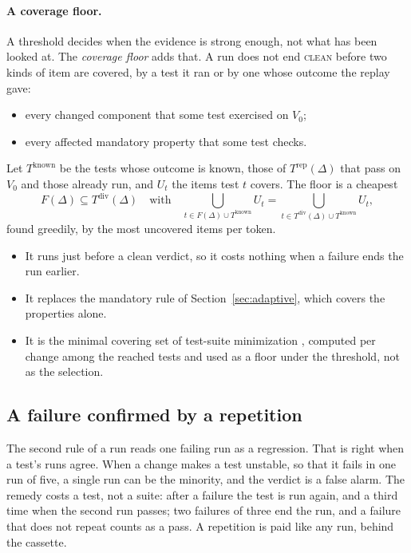 \documentclass[11pt,a4paper]{article}
\newcommand{\clean}{\textsc{clean}}
\begin{document}
\paragraph{A coverage floor.} A threshold decides when the evidence is strong enough, not what has been looked at.
The \emph{coverage floor} adds that. A run does not end \clean{} before two kinds of item are covered, by a test
it ran or by one whose outcome the replay gave:
\begin{itemize}
  \item every changed component that some test exercised on $V_0$;
  \item every affected mandatory property that some test checks.
\end{itemize}
Let $T^{\mathrm{known}}$ be the tests whose outcome is known, those of $T^{\mathrm{rep}}(\Delta)$ that pass on
$V_0$ and those already run, and $U_t$ the items test $t$ covers. The floor is a cheapest
\begin{equation}
  F(\Delta) \subseteq T^{\mathrm{div}}(\Delta) \quad \text{with} \quad
  \bigcup_{t \in F(\Delta) \cup T^{\mathrm{known}}} U_t =
  \bigcup_{t \in T^{\mathrm{div}}(\Delta) \cup T^{\mathrm{known}}} U_t ,
  \label{eq:floor}
\end{equation}
found greedily, by the most uncovered items per token.
\begin{itemize}
  \item It runs just before a clean verdict, so it costs nothing when a failure ends the run earlier.
  \item It replaces the mandatory rule of Section~\ref{sec:adaptive}, which covers the properties alone.
  \item It is the minimal covering set of test-suite minimization \cite{yoo2012regression}, computed per change
        among the reached tests and used as a floor under the threshold, not as the selection.
\end{itemize}

\subsection{A failure confirmed by a repetition}
\label{sec:confirm}

The second rule of a run reads one failing run as a regression. That is right when a test's runs agree. When a
change makes a test unstable, so that it fails in one run of five, a single run can be the minority, and the
verdict is a false alarm. The remedy costs a test, not a suite: after a failure the test is run again, and a third
time when the second run passes; two failures of three end the run, and a failure that does not repeat counts as a
pass. A repetition is paid like any run, behind the cassette.
\end{document}
